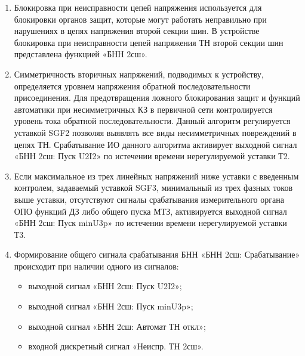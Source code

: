 
\color{black}

\begin{enumerate}

\item
Блокировка при неисправности цепей напряжения используется для блокировки органов защит, которые могут работать неправильно при нарушениях в цепях напряжения второй секции шин. В устройстве блокировка при неисправности цепей напряжения ТН второй секции шин представлена функцией «БНН 2сш».

\item
Симметричность вторичных напряжений, подводимых к устройству, определяется уровнем напряжения обратной последовательности присоединения. Для предотвращения ложного блокирования защит и функций автоматики при несимметричных КЗ в первичной сети контролируется уровень тока обратной последовательности. Данный алгоритм регулируется уставкой SGF2 позволяя выявлять все виды несимметричных повреждений в цепях ТН. Срабатывание ИО данного алгоритма активирует выходной сигнал «БНН 2сш: Пуск U2I2» по истечении времени нерегулируемой уставки Т2.

\item
Если максимальное из трех линейных напряжений ниже уставки с введенным контролем, задаваемый уставкой SGF3, минимальный из трех фазных токов выше уставки, отсутствуют сигналы срабатывания измерительного органа ОПО функций ДЗ либо общего пуска МТЗ, активируется выходной сигнал «БНН 2сш: Пуск minU3p» по истечении времени нерегулируемой уставки Т3.

\item
Формирование общего сигнала срабатывания БНН «БНН 2сш: Срабатывание» происходит при наличии одного из сигналов:
\begin{itemize}
    \item выходной сигнал «БНН 2сш: Пуск U2I2»;
    \item выходной сигнал «БНН 2сш: Пуск minU3p»;
    \item выходной сигнал «БНН 2сш: Автомат ТН откл»;
    \item входной дискретный сигнал «Неиспр. ТН 2сш».
\end{itemize}


\end{enumerate}
